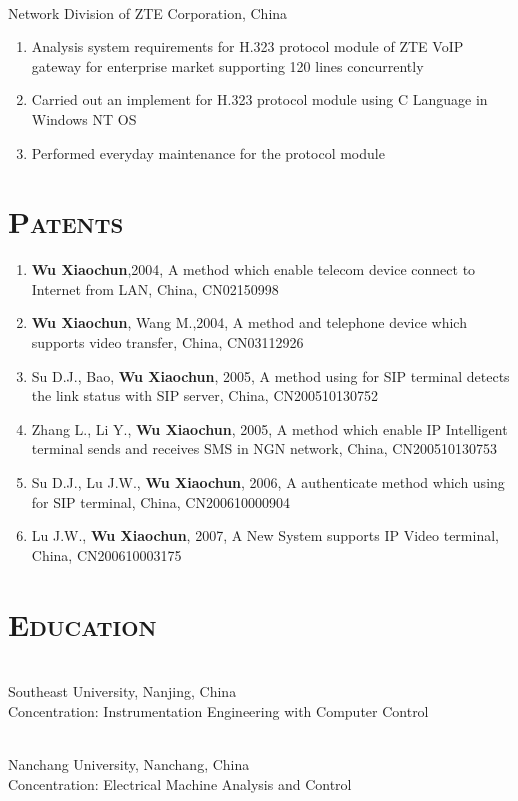 \documentclass[margin,11pt]{res}
\begin{document}
\begin{resume}
     \\
    Network Division of ZTE Corporation, China
     \begin{enumerate}\itemsep -2pt %
     \item Analysis system requirements for H.323 protocol module of ZTE VoIP gateway for enterprise
       market supporting 120 lines concurrently
     \item Carried out an implement for H.323 protocol module using C Language in Windows NT OS
     \item Performed everyday maintenance for the protocol module
     \end{enumerate} 

\section{{\textsc{Patents}}}

\begin{enumerate}
\item \textbf{Wu Xiaochun},2004, A method which enable telecom device connect to Internet from LAN,
  China, CN02150998
\item \textbf{Wu Xiaochun}, Wang M.,2004, A method and telephone device which supports video
  transfer, China, CN03112926
\item Su D.J., Bao, \textbf{Wu Xiaochun}, 2005, A method using for SIP terminal detects the link
  status with SIP server, China, CN200510130752
\item Zhang L., Li Y., \textbf{Wu Xiaochun}, 2005, A method which enable IP Intelligent terminal
  sends and receives SMS in NGN network, China, CN200510130753
\item Su D.J., Lu J.W., \textbf{Wu Xiaochun}, 2006, A authenticate method which using for SIP
  terminal, China, CN200610000904
\item Lu J.W., \textbf{Wu Xiaochun}, 2007, A New System supports IP Video terminal, China,
  CN200610003175
\end{enumerate}

\section{\textsc{Education}} 
  \\
Southeast University, Nanjing, China \\
Concentration: Instrumentation Engineering with Computer Control

 \\
Nanchang University, Nanchang, China \\
Concentration: Electrical Machine Analysis and Control
 
\end{resume}
\end{document}
